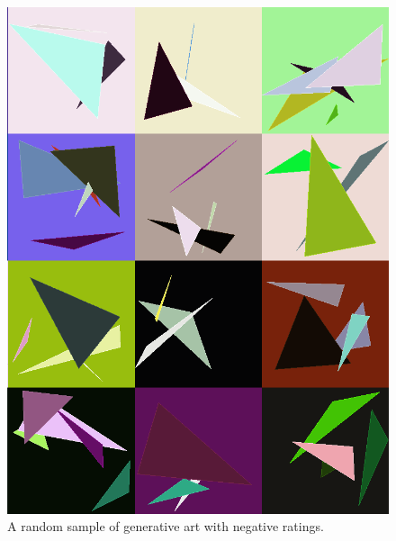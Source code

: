 \documentclass[midd]{thesis}
\begin{document}
\begin{figure}[tp]
\centering
\includegraphics[width=\textwidth]{visualizations/uglygallery-shortened.png}
\caption{A random sample of generative art with negative ratings.}
\label{fig:positive-geneartive-art}
\end{figure}




\nocite{*}

\end{document}
